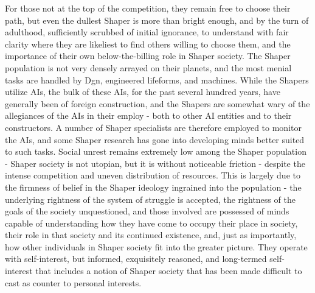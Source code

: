 For those not at the top of the competition, they remain free to
choose their path, but even the dullest Shaper is more than bright
enough, and by the turn of adulthood, sufficiently scrubbed of initial
ignorance, to understand with fair clarity where they are likeliest to
find others willing to choose them, and the importance of their own
below-the-billing role in Shaper society. The Shaper population is not
very densely arrayed on their planets, and the most menial tasks are
handled by Dgn, engineered lifeforms, and machines. While the Shapers
utilize AIs, the bulk of these AIs, for the past several hundred
years, have generally been of foreign construction, and the Shapers
are somewhat wary of the allegiances of the AIs in their employ - both
to other AI entities and to their constructors. A number of Shaper
specialists are therefore employed to monitor the AIs, and some Shaper
research has gone into developing minds better suited to such
tasks. Social unrest remains extremely low among the Shaper population
- Shaper society is not utopian, but it is without noticeable friction
- despite the intense competition and uneven distribution of
resources. This is largely due to the firmness of belief in the Shaper
ideology ingrained into the population - the underlying rightness of
the system of struggle is accepted, the rightness of the goals of the
society unquestioned, and those involved are possessed of minds
capable of understanding how they have come to occupy their place in
society, their role in that society and its continued existence, and,
just as importantly, how other individuals in Shaper society fit into
the greater picture. They operate with self-interest, but informed,
exquisitely reasoned, and long-termed self-interest that includes a
notion of Shaper society that has been made difficult to cast as
counter to personal interests.

